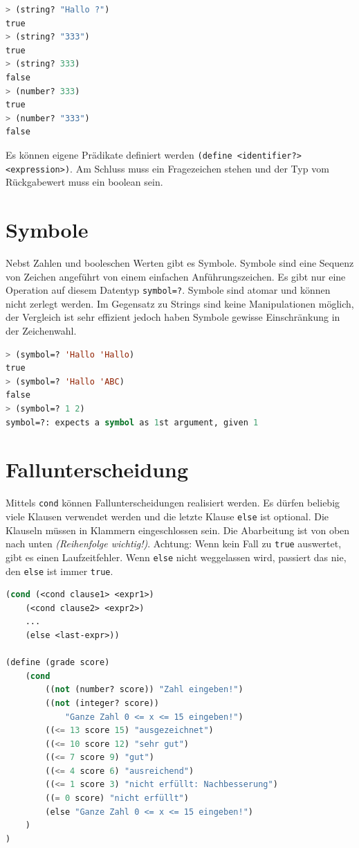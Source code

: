\begin{lstlisting}[language=Lisp, caption=Prädikatsfunktionen]
> (string? "Hallo ?")
true
> (string? "333")
true
> (string? 333)
false
> (number? 333)
true
> (number? "333")
false
\end{lstlisting}

Es können eigene Prädikate definiert werden \verb|(define <identifier?> <expression>)|. Am Schluss muss ein Fragezeichen stehen und der Typ vom Rückgabewert muss ein boolean sein.

\section{Symbole}
Nebst Zahlen und booleschen Werten gibt es Symbole. Symbole sind eine Sequenz von Zeichen angeführt von einem einfachen Anführungszeichen. Es gibt nur eine Operation auf diesem Datentyp \verb|symbol=?|. Symbole sind atomar und können nicht zerlegt werden. Im Gegensatz zu Strings sind keine Manipulationen möglich, der Vergleich ist sehr effizient jedoch haben Symbole gewisse Einschränkung in der Zeichenwahl.

\newpage
 
\begin{lstlisting}[language=Lisp, caption=Symbole]
> (symbol=? 'Hallo 'Hallo)
true
> (symbol=? 'Hallo 'ABC)
false
> (symbol=? 1 2)
symbol=?: expects a symbol as 1st argument, given 1
\end{lstlisting}

\section{Fallunterscheidung}
Mittels \verb|cond| können Fallunterscheidungen realisiert werden. Es dürfen beliebig viele Klausen verwendet werden und die letzte Klause \verb|else| ist optional. Die Klauseln müssen in Klammern eingeschlossen sein. Die Abarbeitung ist von oben nach unten \emph{(Reihenfolge wichtig!)}. Achtung: Wenn kein Fall zu \verb|true| auswertet, gibt es einen Laufzeitfehler. Wenn \verb|else| nicht weggelassen wird, passiert das nie, den \verb|else| ist immer \verb|true|. 

\begin{lstlisting}[language=Lisp, caption=Fallunterscheidung]
(cond (<cond clause1> <expr1>)
	(<cond clause2> <expr2>)
	...
	(else <last-expr>))
	
(define (grade score)
	(cond
		((not (number? score)) "Zahl eingeben!")
		((not (integer? score))
			"Ganze Zahl 0 <= x <= 15 eingeben!")
		((<= 13 score 15) "ausgezeichnet")
		((<= 10 score 12) "sehr gut")
		((<= 7 score 9) "gut")
		((<= 4 score 6) "ausreichend")
		((<= 1 score 3) "nicht erfüllt: Nachbesserung")
		((= 0 score) "nicht erfüllt")
		(else "Ganze Zahl 0 <= x <= 15 eingeben!")
	)
)
\end{lstlisting}

